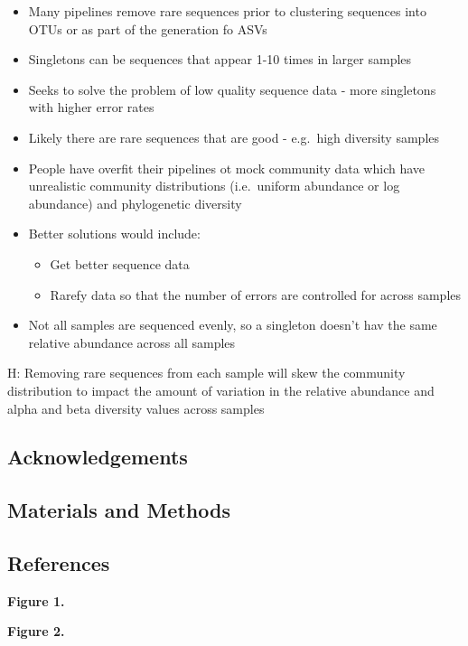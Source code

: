 \documentclass[11pt,]{article}
\providecommand{\tightlist}{%
  \setlength{\itemsep}{0pt}\setlength{\parskip}{0pt}}
\begin{document}
\begin{itemize}
\tightlist
\item
  Many pipelines remove rare sequences prior to clustering sequences
  into OTUs or as part of the generation fo ASVs
\item
  Singletons can be sequences that appear 1-10 times in larger samples
\item
  Seeks to solve the problem of low quality sequence data - more
  singletons with higher error rates
\item
  Likely there are rare sequences that are good - e.g.~high diversity
  samples
\item
  People have overfit their pipelines ot mock community data which have
  unrealistic community distributions (i.e.~uniform abundance or log
  abundance) and phylogenetic diversity
\item
  Better solutions would include:

  \begin{itemize}
  \tightlist
  \item
    Get better sequence data
  \item
    Rarefy data so that the number of errors are controlled for across
    samples
  \end{itemize}
\item
  Not all samples are sequenced evenly, so a singleton doesn't hav the
  same relative abundance across all samples
\end{itemize}

H: Removing rare sequences from each sample will skew the community
distribution to impact the amount of variation in the relative abundance
and alpha and beta diversity values across samples

\newpage

\hypertarget{acknowledgements}{%
\subsection{Acknowledgements}\label{acknowledgements}}

\newpage

\hypertarget{materials-and-methods}{%
\subsection{Materials and Methods}\label{materials-and-methods}}

\newpage

\hypertarget{references}{%
\subsection{References}\label{references}}

\hypertarget{refs}{}

\newpage

\textbf{Figure 1.}

\newpage

\textbf{Figure 2.}
\end{document}
